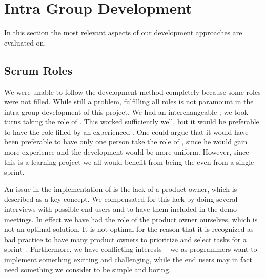 \section{Intra Group Development}
\label{sec:intragroupdev}

In this section the most relevant aspects of our development approaches are evaluated on.

\subsection{Scrum Roles}
We were unable to follow the \scrum{} development method completely because some roles were not filled.
While still a problem, fulfilling all roles is not paramount in the intra group development of this project.
We had an interchangeable \scrummaster{}; we took turns taking the role of \scrummaster{}.
This worked sufficiently well, but it would be preferable to have the role filled by an experienced \scrummaster{}.
One could argue that it would have been preferable to have only one person take the role of \scrummaster{}, since he would gain more experience and the development would be more uniform.
However, since this is a learning project we all would benefit from being the \scrummaster{} even from a single sprint.

An issue in the implementation of \sos{} is the lack of a product owner, which is described as a key concept. 
We compensated for this lack by doing several interviews with possible end users and to have them included in the demo meetings. 
In effect we have had the role of the product owner ourselves, which is not an optimal solution. 
It is not optimal for the reason that it is recognized as bad \scrum{} practice to have many product owners to prioritize and select tasks for a sprint~\cite[p.~128]{Larman04}. 
Furthermore, we have conflicting interests -- we as programmers want to implement something exciting and challenging, while the end users may in fact need something we consider to be simple and boring.



